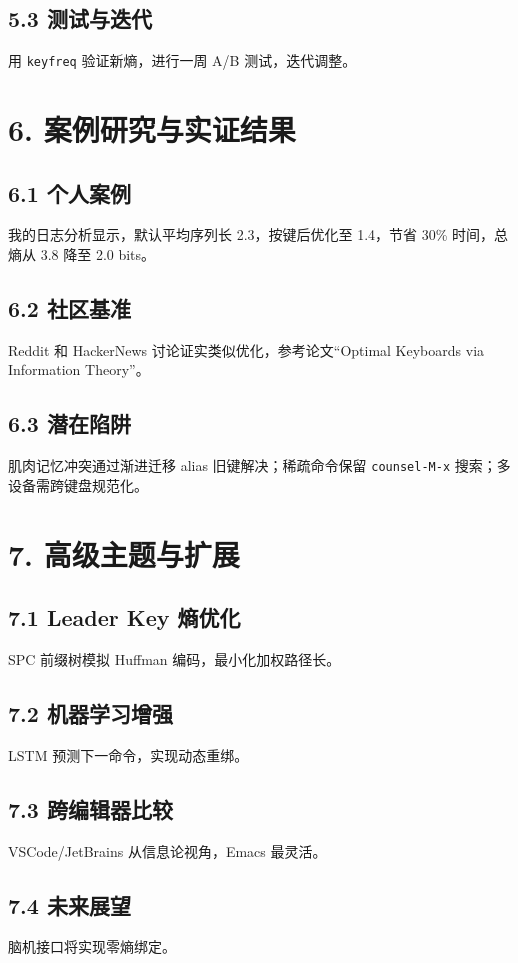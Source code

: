 \section{5.3 测试与迭代}
用 \texttt{keyfreq} 验证新熵，进行一周 A/B 测试，迭代调整。\par
\chapter{6. 案例研究与实证结果}
\section{6.1 个人案例}
我的日志分析显示，默认平均序列长 2.3，按键后优化至 1.4，节省 30\%{} 时间，总熵从 3.8 降至 2.0 bits。\par
\section{6.2 社区基准}
Reddit 和 HackerNews 讨论证实类似优化，参考论文“Optimal Keyboards via Information Theory”。\par
\section{6.3 潜在陷阱}
肌肉记忆冲突通过渐进迁移 alias 旧键解决；稀疏命令保留 \texttt{counsel-M-x} 搜索；多设备需跨键盘规范化。\par
\chapter{7. 高级主题与扩展}
\section{7.1 Leader Key 熵优化}
SPC 前缀树模拟 Huffman 编码，最小化加权路径长。\par
\section{7.2 机器学习增强}
LSTM 预测下一命令，实现动态重绑。\par
\section{7.3 跨编辑器比较}
VSCode/JetBrains 从信息论视角，Emacs 最灵活。\par
\section{7.4 未来展望}
脑机接口将实现零熵绑定。\par
